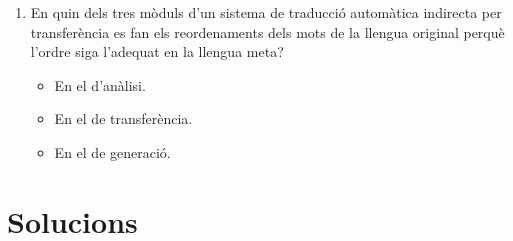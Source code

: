 \begin{enumerate}
\item En quin dels tres mòduls d'un sistema de traducció automàtica indirecta per transferència es fan els reordenaments dels mots de la llengua original perquè l'ordre siga l'adequat en la llengua meta?
  \begin{itemize}
  \item En el d'anàlisi.
  \item En el de transferència.
  \item En el de generació.
  \end{itemize}


\end{enumerate}

\section{Solucions}
